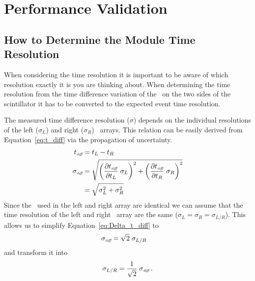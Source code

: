 \documentclass[../BTOF_summary.tex]{subfiles}
\begin{document}
\section{Performance Validation}

\subsection{How to Determine the Module Time Resolution}

When considering the time resolution it is important to be aware of which resolution exactly it is you are thinking about.
When determining the time resolution from the time difference variation of the \sipms\ on the two sides of the scintillator it has to be converted to the expected event time resolution.

The measured time difference resolution ($\sigma$) depends on the individual resolutions of the left ($\sigma_L$) and right ($\sigma_R$) \sipm\ arrays. This relation can be easily derived from Equation~\eqref{eq:t_diff} via the propagation of uncertainty.
\begin{align}
	t_{\textit{\tiny diff}} &= t_L - t_R \label{eq:t_diff} \\
	\sigma_{\textit{\tiny diff}} &= \sqrt{ \left( \frac{\partial t_{\textit{\tiny diff}}}{\partial t_L} \; \sigma_L \right)^2 + \left( \frac{\partial t_{\textit{\tiny diff}}}{\partial t_R} \; \sigma_R \right)^2} \nonumber \\
	&= \sqrt{\sigma_L^2 + \sigma_R^2} \label{eq:Delta_t_diff}
\end{align}
Since the \sipms\ used in the left and right array are identical we can assume that the time resolution of the left and right \sipm\ array are the same ($\sigma_L = \sigma_R = \sigma_{L/R}$). This allows us to simplify Equation~\eqref{eq:Delta_t_diff} to
\begin{align*}
	\sigma_{\textit{\tiny diff}} &= \sqrt{2} \; \sigma_{L/R}
\end{align*}
and transform it into
\begin{equation}
	\sigma_{L/R} = \frac{1}{\sqrt{2}} \; \sigma_{\textit{\tiny diff}} \: . \label{eq:Dt_LR}
\end{equation}
\end{document}
